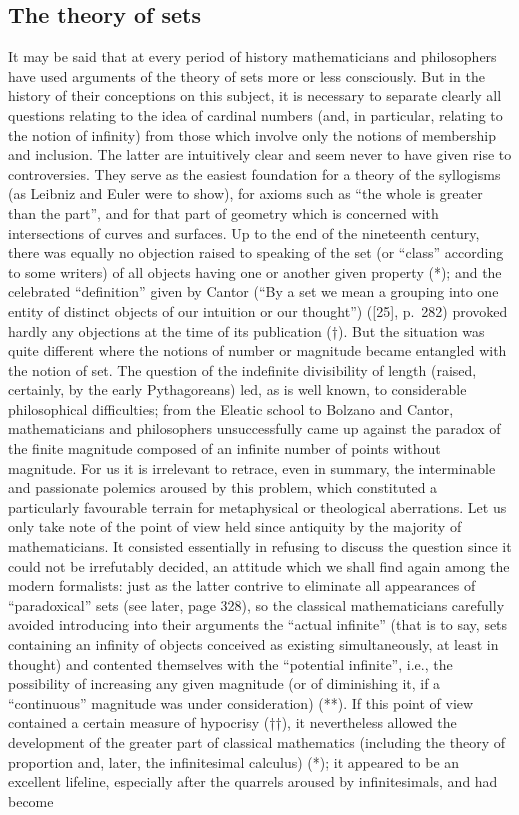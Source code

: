 \subsection*{The theory of sets}

It may be said that at every period of history mathematicians and philosophers have used arguments of the theory of sets more or less consciously. But in the history of their conceptions on this subject, it is necessary to separate clearly all questions relating to the idea of cardinal numbers (and, in particular, relating to the notion of infinity) from those which involve only the notions of membership and inclusion. The latter are intuitively clear and seem never to have given rise to controversies. They serve as the easiest foundation for a theory of the syllogisms (as Leibniz and Euler were to show), for axioms such as ``the whole is greater than the part'', and for that part of geometry which is concerned with intersections of curves and surfaces. Up to the end of the nineteenth century, there was equally no objection raised to speaking of the set (or ``class'' according to some writers) of all objects having one or another given property (*); and the celebrated ``definition'' given by Cantor (``By a set we mean a grouping into one entity of distinct objects of our intuition or our thought'') ({[}25{]}, p.~282) provoked hardly any objections at the time of its publication (†). But the situation was quite different where the notions of number or magnitude became entangled with the notion of set. The question of the indefinite divisibility of length (raised, certainly, by the early Pythagoreans) led, as is well known, to considerable philosophical difficulties; from the Eleatic school to Bolzano and Cantor, mathematicians and philosophers unsuccessfully came up against the paradox of the finite magnitude composed of an infinite number of points without magnitude. For us it is irrelevant to retrace, even in summary, the interminable and passionate polemics aroused by this problem, which constituted a particularly favourable terrain for metaphysical or theological aberrations. Let us only take note of the point of view held since antiquity by the majority of mathematicians. It consisted essentially in refusing to discuss the question since it could not be irrefutably decided, an attitude which we shall find again among the modern formalists: just as the latter contrive to eliminate all appearances of ``paradoxical'' sets (see later, page 328), so the classical mathematicians carefully avoided introducing into their arguments the ``actual infinite'' (that is to say, sets containing an infinity of objects conceived as existing simultaneously, at least in thought) and contented themselves with the ``potential infinite'', i.e., the possibility of increasing any given magnitude (or of diminishing it, if a ``continuous'' magnitude was under consideration) (**). If this point of view contained a certain measure of hypocrisy (††), it nevertheless allowed the development of the greater part of classical mathematics (including the theory of proportion and, later, the infinitesimal calculus) (*); it appeared to be an excellent lifeline, especially after the quarrels aroused by infinitesimals, and had become 